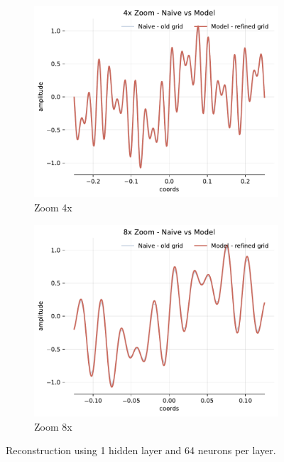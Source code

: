 \begin{figure}[h]
    \begin{subfigure}[b]{0.4\textwidth}
        \centering
        \includegraphics[width=\textwidth]{img/ch4/4x_zoom_1hl_64hf_w10.pdf}
        \caption{Zoom 4x}
        \label{fig:4x-freqs-1hl-64hf}
    \end{subfigure}
    \begin{subfigure}[b]{0.4\textwidth}
        \centering
        \includegraphics[width=\textwidth]{img/ch4/8x_zoom_1hl_64hf_w10.pdf}
        \caption{Zoom 8x}
        \label{fig:8x-freqs-1hl-64hf}
    \end{subfigure}
    \caption{Reconstruction using 1 hidden layer and 64 neurons per layer.}
    \label{f:w10-1hl-64hf}
\end{figure}

